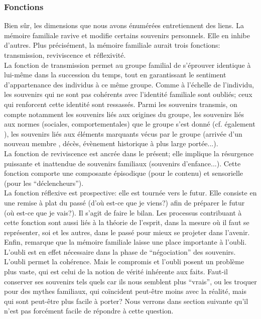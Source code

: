 \documentclass[french]{article}
\begin{document}
	\subsubsection{Fonctions}
			Bien sûr, les dimensions que nous avons énumérées entretiennent des liens. La mémoire familiale ravive et modifie certains souvenirs personnels. Elle en inhibe d'autres. Plus précisément, la mémoire familiale aurait trois fonctions: transmission, reviviscence et réflexivité.\\
			
			La fonction de transmission permet au groupe familial de s'éprouver identique à lui-même dans la succession du temps, tout en garantissant le sentiment d'appartenance des individus à ce même groupe. Comme à l'échelle de l'individu, les souvenirs qui ne sont pas cohérents avec l'identité familiale sont oubliés; ceux qui renforcent cette identité sont ressassés. Parmi les souvenirs transmis, on compte notamment les souvenirs liés aux origines du groupe, les souvenirs liés aux normes (sociales, comportementales) que le groupe s'est donné (cf. également \cite[p.~110-111]{halbwachs1925}), les souvenirs liés aux éléments marquants vécus par le groupe (arrivée d'un nouveau membre \cite[p.~121]{halbwachs1925}, décès, évènement historique à plus large portée...).\\
			
			La fonction de reviviscence est ancrée dans le présent; elle implique la résurgence puissante et inattendue de souvenirs familiaux (souvenirs d'enfance...). Cette fonction comporte une composante épisodique (pour le contenu) et sensorielle (pour les ``déclencheurs'').\\
			
			La fonction réflexive est prospective: elle est tournée vers le futur. Elle consiste en une remise à plat du passé (d'où est-ce que je viens?) afin de préparer le futur (où est-ce que je vais?). Il s'agit de faire le bilan. Les processus contribuant à cette fonction sont aussi liés à la théorie de l'esprit, dans la mesure où il faut se représenter, soi et les autres, dans le passé pour mieux se projeter dans l'avenir. \\
			
			Enfin, \cite{muxel2012} remarque que la mémoire familiale laisse une place importante à l'oubli. L'oubli est en effet nécessaire dans la phase de ``négociation'' des souvenirs. L'oubli permet la cohérence. Mais le compromis et l'oubli posent un problème plus vaste, qui est celui de la notion de vérité inhérente aux faits. Faut-il conserver ses souvenirs tels quels car ils nous semblent plus ``vrais'', ou les troquer pour des mythes familiaux, qui coïncident peut-être moins avec la réalité, mais qui sont peut-être plus facile à porter? Nous verrons dans section suivante qu'il n'est pas forcément facile de répondre à cette question.
			
\end{document}
